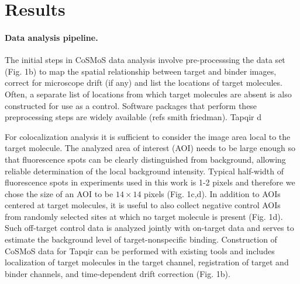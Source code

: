 \section*{Results}
\paragraph{Data analysis pipeline.}
The initial steps in CoSMoS data analysis involve pre-processsing the data set (Fig. 1b) to map the spatial relationship between target and binder images, correct for microscope drift (if any) and list the locations of target molecules. Often, a separate list of locations from which target molecules are absent is also constructed for use as a control.  Software packages that perform these preprocessing steps are widely available (refs smith friedman).  Tapqir d

For colocalization analysis it is sufficient to consider the image area local to the target molecule. The analyzed area of interest (AOI) needs to be large enough so that fluorescence spots can be clearly distinguished from background, allowing  reliable  determination of the  local  background  intensity. Typical half-width of fluorescence spots in experiments used in this work is 1-2 pixels and therefore we chose the size of an AOI to be $14\times14$ pixels (Fig. 1c,d). In addition to AOIs centered at target molecules, it is useful to also collect negative control AOIs from randomly selected sites at which no target molecule is present (Fig. 1d). Such off-target control data is analyzed jointly with on-target data and serves to estimate the background level of target-nonspecific binding. Construction of CoSMoS data for Tapqir can be performed with existing tools and includes localization of target molecules in the target channel, registration of target and binder channels, and time-dependent drift correction \cite{Friedman2015-nx, Smith2019-yb} (Fig. 1b).


